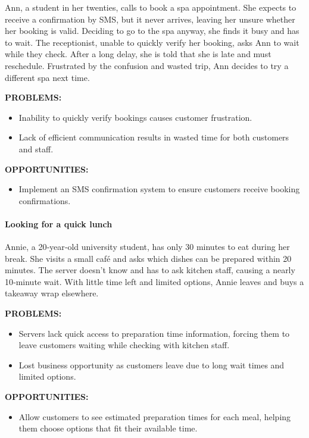 \documentclass[]{VUMIFTemplateClass}
\newcommand{\subsubsubsection}[1]{\paragraph{#1}}
\begin{document}
Ann, a student in her twenties, calls to book a spa appointment. She expects to receive a confirmation by SMS, but it never arrives, leaving her unsure whether her booking is valid. Deciding to go to the spa anyway, she finds it busy and has to wait. The receptionist, unable to quickly verify her booking, asks Ann to wait while they check. After a long delay, she is told that she is late and must reschedule. Frustrated by the confusion and wasted trip, Ann decides to try a different spa next time.

\textbf{PROBLEMS:}
\begin{itemize}
    \item Inability to quickly verify bookings causes customer frustration.
    \item Lack of efficient communication results in wasted time for both customers and staff.
\end{itemize}

\textbf{OPPORTUNITIES:}
\begin{itemize}
    \item Implement an SMS confirmation system to ensure customers receive booking confirmations.
\end{itemize}

\subsubsubsection{Looking for a quick lunch}
\label{subsubsubsec:quick-lunch}

Annie, a 20‑year‑old university student, has only 30 minutes to eat during her break. She visits a small café and asks which dishes can be prepared within 20 minutes. The server doesn’t know and has to ask kitchen staff, causing a nearly 10‑minute wait. With little time left and limited options, Annie leaves and buys a takeaway wrap elsewhere.

\textbf{PROBLEMS:}
\begin{itemize}
    \item Servers lack quick access to preparation time information, forcing them to leave customers waiting while checking with kitchen staff.
    \item Lost business opportunity as customers leave due to long wait times and limited options.
\end{itemize}

\textbf{OPPORTUNITIES:}
\begin{itemize}
    \item Allow customers to see estimated preparation times for each meal, helping them choose options that fit their available time.
\end{itemize}
\end{document}
